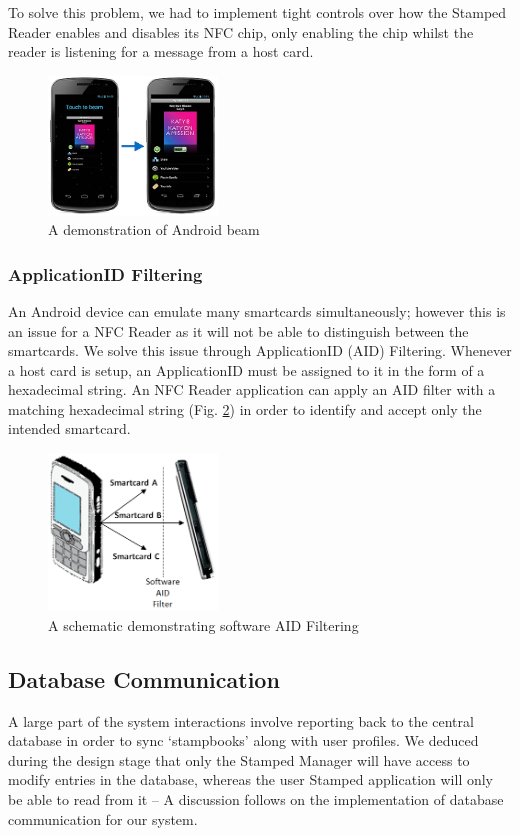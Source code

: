 To solve this problem, we had to implement tight controls over how the Stamped Reader enables and disables its NFC chip, only enabling the chip whilst the reader is listening for a message from a host card.

\begin{figure}[H]
 \centering
  \includegraphics[width=0.40\textwidth]{img/androidBeam.jpg}
     \caption{A demonstration of Android beam}
     \label{fig:androidBeam}
\end{figure}

\subsubsection{ApplicationID Filtering}
An Android device can emulate many smartcards simultaneously; however this is an issue for a NFC Reader as it will not be able to distinguish between the smartcards. We solve this issue through ApplicationID (AID) Filtering. Whenever a host card is setup, an ApplicationID must be assigned to it in the form of a hexadecimal string. An NFC Reader application can apply an AID filter with a matching hexadecimal string (Fig. \ref{fig:aidfilter}) in order to identify and accept only the intended smartcard.

\begin{figure}[H]
 \centering
  \includegraphics[width=0.40\textwidth]{img/aidfilter.png}
     \caption{A schematic demonstrating software AID Filtering}
     \label{fig:aidfilter}
\end{figure}

\subsection{Database Communication}
\label{sec:databasecommunication}
A large part of the system interactions involve reporting back to the central database in order to sync `stampbooks' along with user profiles. We deduced during the design stage that only the Stamped Manager will have access to modify entries in the database, whereas the user Stamped application will only be able to read from it -- A discussion follows on the implementation of database communication for our system.
